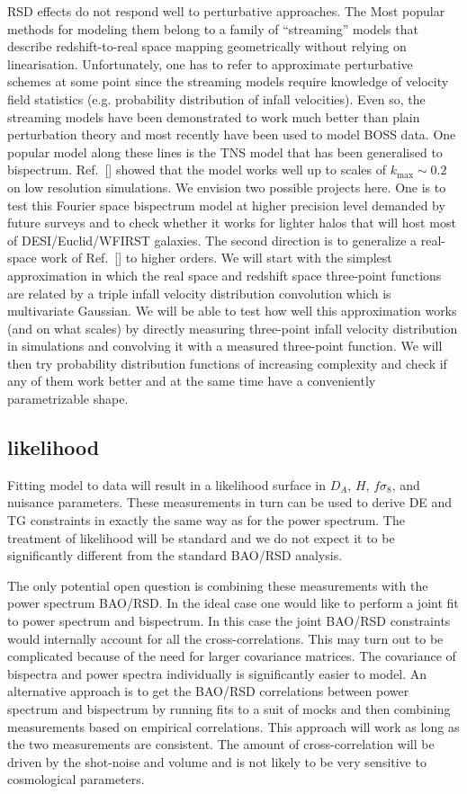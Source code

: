 RSD effects do not respond well to perturbative approaches. The Most popular
methods for modeling them belong to a family of ``streaming'' models that
describe redshift-to-real space mapping geometrically without relying on
linearisation. Unfortunately, one has to refer to approximate perturbative
schemes at some point since the streaming models require knowledge of velocity
field statistics (e.g. probability distribution of infall velocities). Even so,
the streaming models have been demonstrated to work much better than plain
perturbation theory and most recently have been used to model BOSS data. One
popular model along these lines is the TNS model that has been generalised to
bispectrum. Ref.~[] showed that the model works well up to scales of
$k_\mathrm{max} \sim 0.2$ on low resolution simulations. We envision two
possible projects here. One is to test this Fourier space bispectrum model at
higher precision level demanded by future surveys and to check whether it works
for lighter halos that will host most of DESI/Euclid/WFIRST galaxies. The
second direction is to generalize a real-space work of Ref.~[] to higher
orders. We will start with the simplest approximation in which the real space
and redshift space three-point functions are related by a triple infall
velocity distribution convolution which is multivariate Gaussian. We will be
able to test how well this approximation works (and on what scales) by directly
measuring three-point infall velocity distribution in simulations and
convolving it with a measured three-point function. We will then try
probability distribution functions of increasing complexity and check if any of
them work better and at the same time have a conveniently parametrizable shape.

\subsection*{likelihood}

Fitting model to data will result in a likelihood surface in $D_A$, $H$,
$f\sigma_8$, and nuisance parameters. These measurements in turn can be used to
derive DE and TG constraints in exactly the same way as for the power spectrum.
The treatment of likelihood will be standard and we do not expect it to be
significantly different from the standard BAO/RSD analysis. 

The only potential open question is combining these measurements with the power
spectrum BAO/RSD. In the ideal case one would like to perform a joint fit to
power spectrum and bispectrum. In this case the joint BAO/RSD constraints would
internally account for all the cross-correlations. This may turn out to be
complicated because of the need for larger covariance matrices. The covariance
of bispectra and power spectra individually is significantly easier to model.
An alternative approach is to get the BAO/RSD correlations between power
spectrum and bispectrum by running fits to a suit of mocks and then combining
measurements based on empirical correlations. This approach will work as long
as the two measurements are consistent. The amount of cross-correlation will
be driven by the shot-noise and volume and is not likely to be very sensitive
to cosmological parameters.

